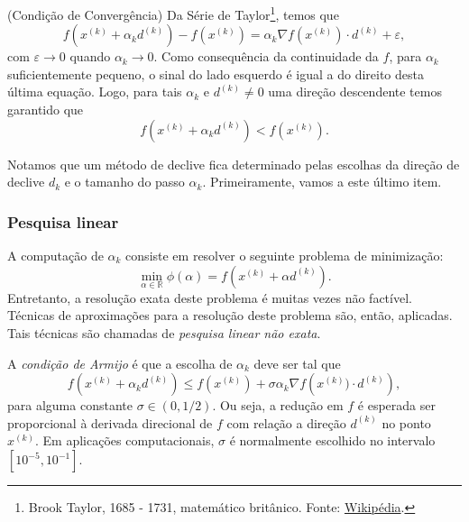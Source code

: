 \begin{obs}(Condição de Convergência)
  Da Série de Taylor\footnote{Brook Taylor, 1685 - 1731, matemático britânico. Fonte: \href{https://pt.wikipedia.org/wiki/Brook_Taylor}{Wikipédia}.}, temos que
  \begin{equation}
    f(x^{(k)}+\alpha_kd^{(k)}) - f(x^{(k)}) = \alpha_k\nabla f(x^{(k)})\cdot d^{(k)} + \varepsilon,
  \end{equation}
  com $\varepsilon\to 0$ quando $\alpha_k\to 0$. Como consequência da continuidade da $f$, para $\alpha_k$ suficientemente pequeno, o sinal do lado esquerdo é igual a do direito desta última equação. Logo, para tais $\alpha_k$ e $d^{(k)}\neq 0$ uma direção descendente temos garantido que
  \begin{equation}
    f(x^{(k)}+\alpha_kd^{(k)}) < f(x^{(k)}).
  \end{equation}
\end{obs}


Notamos que um método de declive fica determinado pelas escolhas da direção de declive $d_k$ e o tamanho do passo $\alpha_k$. Primeiramente, vamos a este último item.

\subsubsection{Pesquisa linear}

A computação de $\alpha_k$ consiste em resolver o seguinte problema de minimização:
\begin{equation}
  \min_{\alpha\in\mathbb{R}} \phi(\alpha) = f(x^{(k)}+\alpha d^{(k)}).
\end{equation}
Entretanto, a resolução exata deste problema é muitas vezes não factível. Técnicas de aproximações para a resolução deste problema são, então, aplicadas. Tais técnicas são chamadas de \emph{pesquisa linear não exata}.

A \emph{condição de Armijo} é que a escolha de $\alpha_k$ deve ser tal que
\begin{equation} \label{eq:condArmijo}
  f\left(x^{(k)}+\alpha_k d^{(k)}\right) \leq f(x^{(k)}) + \sigma \alpha_k \nabla f\left(x^{(k)})\cdot d^{(k)}\right),
\end{equation}
para alguma constante $\sigma\in (0, 1/2)$. Ou seja, a redução em $f$ é esperada ser proporcional à derivada direcional de $f$ com relação a direção $d^{(k)}$ no ponto $x^{(k)}$. Em aplicações computacionais, $\sigma$ é normalmente escolhido no intervalo $[10^{-5}, 10^{-1}]$. 


